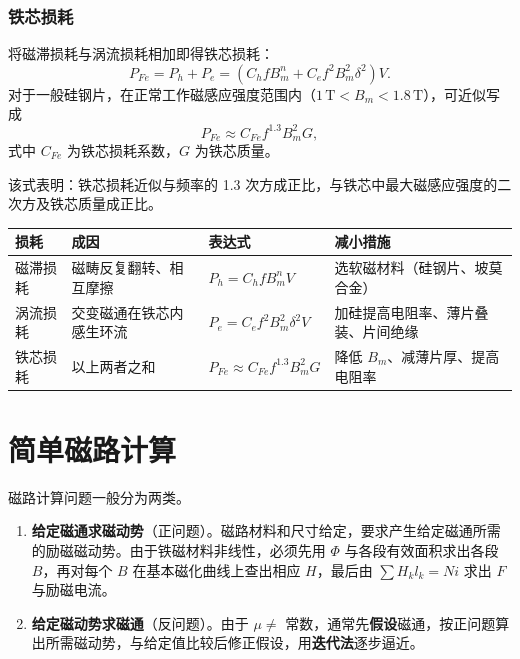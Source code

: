 \subsubsection{铁芯损耗}
将磁滞损耗与涡流损耗相加即得铁芯损耗：
\begin{equation}
P_{Fe}=P_h+P_e=\left(C_h f B_m^{n}+C_e f^{2}B_m^{2}\delta^{2}\right)V .
\end{equation}
对于一般硅钢片，在正常工作磁感应强度范围内（$1\,\mathrm{T}<B_m<1.8\,\mathrm{T}$），可近似写成
\begin{equation}
P_{Fe}\approx C_{Fe}f^{1.3}B_m^{2}G ,
\end{equation}
式中 $C_{Fe}$ 为铁芯损耗系数，$G$ 为铁芯质量。


该式表明：铁芯损耗近似与频率的 1.3 次方成正比，与铁芯中最大磁感应强度的二次方及铁芯质量成正比。

\begin{center}
\begin{tabular}{@{}llll@{}}
\toprule
损耗 & 成因 & 表达式 & 减小措施 \\
\midrule
磁滞损耗 & 磁畴反复翻转、相互摩擦 & $P_h=C_hfB_m^{n}V$ & 选软磁材料（硅钢片、坡莫合金） \\
涡流损耗 & 交变磁通在铁芯内感生环流 & $P_e=C_ef^{2}B_m^{2}\delta^{2}V$ & 加硅提高电阻率、薄片叠装、片间绝缘 \\
铁芯损耗 & 以上两者之和 & $P_{Fe}\approx C_{Fe}f^{1.3}B_m^{2}G$ & 降低 $B_m$、减薄片厚、提高电阻率 \\
\bottomrule
\end{tabular}
\end{center}


\section{简单磁路计算}

磁路计算问题一般分为两类。

\begin{enumerate}
  \item \textbf{给定磁通求磁动势}（正问题）。磁路材料和尺寸给定，要求产生给定磁通所需的励磁磁动势。由于铁磁材料非线性，必须先用 $\Phi$ 与各段有效面积求出各段 $B$，再对每个 $B$ 在基本磁化曲线上查出相应 $H$，最后由 $\sum H_kl_k=Ni$ 求出 $F$ 与励磁电流。
  \item \textbf{给定磁动势求磁通}（反问题）。由于 $\mu\neq$ 常数，通常先\textbf{假设}磁通，按正问题算出所需磁动势，与给定值比较后修正假设，用\textbf{迭代法}逐步逼近。
\end{enumerate}

